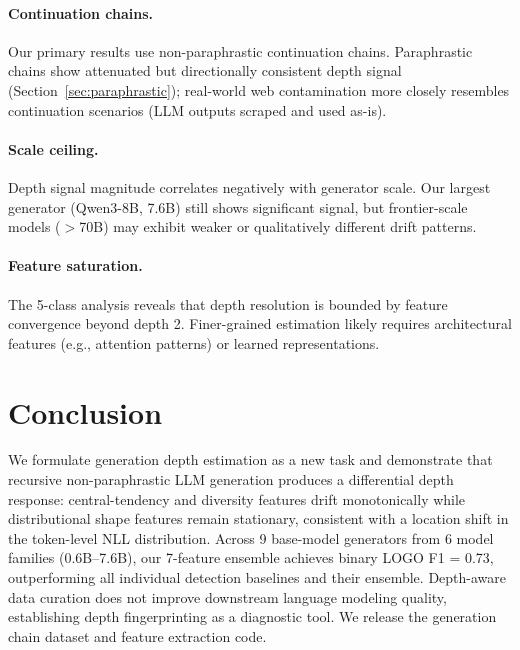 \documentclass[11pt,a4paper]{article}
\begin{document}
\paragraph{Continuation chains.}
Our primary results use non-paraphrastic continuation chains. Paraphrastic chains show attenuated but directionally consistent depth signal (Section~\ref{sec:paraphrastic}); real-world web contamination more closely resembles continuation scenarios (LLM outputs scraped and used as-is).

\paragraph{Scale ceiling.}
Depth signal magnitude correlates negatively with generator scale. Our largest generator (Qwen3-8B, 7.6B) still shows significant signal, but frontier-scale models ($>$70B) may exhibit weaker or qualitatively different drift patterns.

\paragraph{Feature saturation.}
The 5-class analysis reveals that depth resolution is bounded by feature convergence beyond depth 2. Finer-grained estimation likely requires architectural features (e.g., attention patterns) or learned representations.

\section{Conclusion}

We formulate generation depth estimation as a new task and demonstrate that recursive non-paraphrastic LLM generation produces a differential depth response: central-tendency and diversity features drift monotonically while distributional shape features remain stationary, consistent with a location shift in the token-level NLL distribution. Across 9 base-model generators from 6 model families (0.6B--7.6B), our 7-feature ensemble achieves binary LOGO F1 = 0.73, outperforming all individual detection baselines and their ensemble. Depth-aware data curation does not improve downstream language modeling quality, establishing depth fingerprinting as a diagnostic tool. We release the generation chain dataset and feature extraction code.
\end{document}

